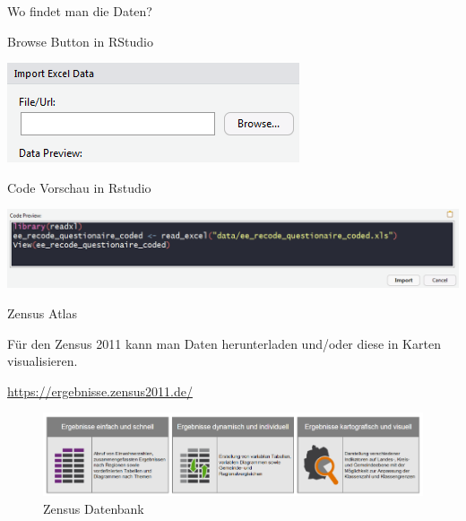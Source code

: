 \documentclass[ignorenonframetext,]{beamer}
\begin{document}
\begin{frame}{Wo findet man die Daten?}
\protect\hypertarget{wo-findet-man-die-daten}{}

\begin{block}{Browse Button in RStudio}

\includegraphics{figure/importBrowse.PNG}

\end{block}

\begin{block}{Code Vorschau in Rstudio}

\includegraphics{figure/codepreview.PNG}

\end{block}

\end{frame}

\begin{frame}{Zensus Atlas}
\protect\hypertarget{zensus-atlas}{}

Für den Zensus 2011 kann man Daten herunterladen und/oder diese in
Karten visualisieren.

\begin{block}{\url{https://ergebnisse.zensus2011.de/}}

\begin{figure}
\centering
\includegraphics{figure/Zensusdtb.PNG}
\caption{Zensus Datenbank}
\end{figure}

\end{block}

\end{frame}
\end{document}
